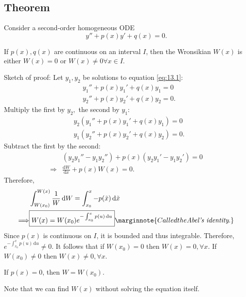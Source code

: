 \documentclass[10pt]{article}
\begin{document}
    \subsection{Theorem}
    Consider a second-order homogeneous ODE 
    \begin{equation}\label{eq:13.1}
        y''+p(x)y'+q(x)=0.
    \end{equation}
    \begin{theorem}[Abel]\label{thm:Abel}
        If $p(x),q(x)$ are continuous on an interval $I$, then the Wronsikian $W(x)$ is either $ W(x)=0 $ or $ W(x)\neq 0 \forall x\in I $.
    \end{theorem}
    Sketch of proof: Let $y_1,y_2$ be solutions to equation \ref{eq:13.1}:
    \[
        \begin{aligned}
             &y_1''+p(x)y_1'+q(x)y_1=0\\
             &y_2''+p(x)y_2'+q(x)y_2=0.
        \end{aligned}
    \]
    Multiply the first by $y_2,$ the second by $y_1$:
    \[
        \begin{aligned}
            &y_2(y_1''+p(x)y_1'+q(x)y_1)=0\\
            &y_1(y_2''+p(x)y_2'+q(x)y_2)=0.
       \end{aligned}
    \]
    Subtract the first by the second:
    \[
        \begin{aligned}
            &(y_2y_1''-y_1y_2'')+p(x)(y_2y_1'-y_1y_2')=0\\
            \Longrightarrow & \frac{\mathrm{d}W}{\mathrm{d}x}+p(x)W(x)=0. 
        \end{aligned}
    \]
    Therefore,
    \[
        \begin{aligned}
            &\int_{W(x_0)}^{W(x)} \frac{1}{W} \,\mathrm{d}W = \int_{x_0}^x -p(\tilde{x}) \,\mathrm{d}\tilde{x}\\
            \Longrightarrow  & \boxed{W(x)=W(x_0)e^{-\int_{x_0}^{x} p(u) \,\mathrm{d}u}}\marginnote{Called the \textit{Abel's identity}.}
        \end{aligned}
    \]
    Since $p(x)$ is continuous on $I$, it is bounded and thus integrable. Therefore, $ e^{-\int_{x_0}^{x} p(u) \,\mathrm{d}u}\neq 0 $. It follows that if $ W(x_0)=0 $ then $ W(x)=0, \forall x $. If $ W(x_0)\neq 0 $ then $ W(x)\neq 0, \forall x $.
    \begin{corollary}\label{col:abel}
            If $p(x)=0$, then $ W=W(x_0) $.
    \end{corollary}
    Note that we can find $ W(x) $ without solving the equation itself.
\end{document}
